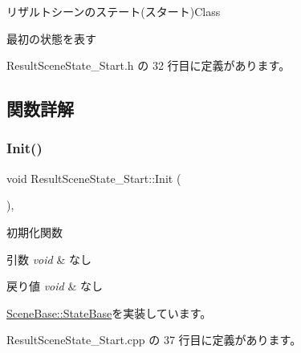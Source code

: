 リザルトシーンのステート(スタート)Class

最初の状態を表す 

 Result\+Scene\+State\+\_\+\+Start.\+h の 32 行目に定義があります。



\subsection{関数詳解}
\mbox{\label{class_result_scene_state___start_a615c7e05efd2320b8956c5fd94398f55}} 
\subsubsection{\texorpdfstring{Init()}{Init()}}
{\footnotesize\ttfamily void Result\+Scene\+State\+\_\+\+Start\+::\+Init (\begin{DoxyParamCaption}{ }\end{DoxyParamCaption})\hspace{0.3cm}{\ttfamily [override]}, {\ttfamily [virtual]}}



初期化関数 


\begin{DoxyParams}{引数}
{\em void} & なし \\
\hline
\end{DoxyParams}

\begin{DoxyRetVals}{戻り値}
{\em void} & なし \\
\hline
\end{DoxyRetVals}


\mbox{\hyperlink{class_scene_base_1_1_state_base_a33350231b039a2178c19beac0211c5b8}{Scene\+Base\+::\+State\+Base}}を実装しています。



 Result\+Scene\+State\+\_\+\+Start.\+cpp の 37 行目に定義があります。

